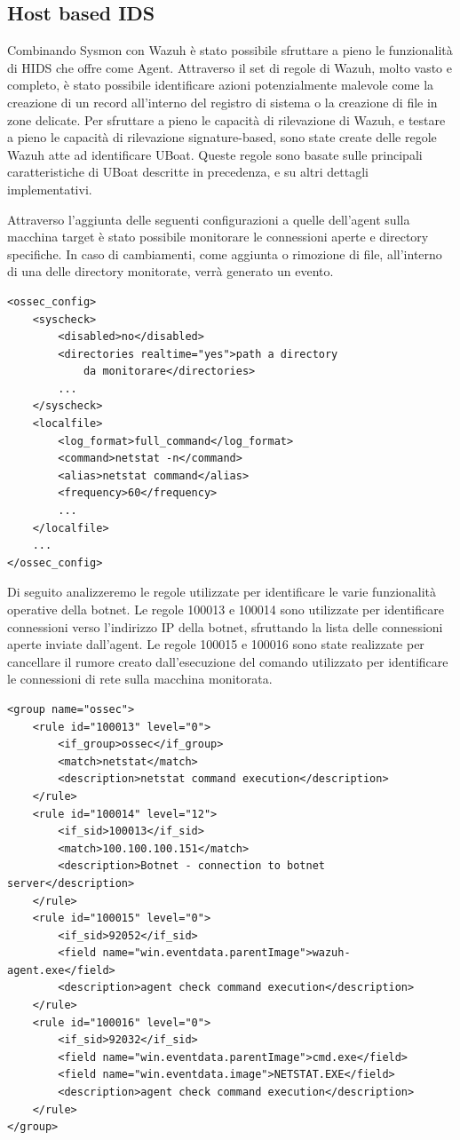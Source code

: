 \subsection{Host based IDS}
Combinando Sysmon con Wazuh è stato possibile sfruttare a pieno le funzionalità di HIDS che offre come Agent. Attraverso il set di regole di Wazuh, molto vasto e completo, è stato possibile identificare azioni potenzialmente malevole come la creazione di un record all'interno del registro di sistema o la creazione di file in zone delicate. Per sfruttare a pieno le capacità di rilevazione di Wazuh, e testare a pieno le capacità di rilevazione signature-based, sono state create delle regole Wazuh atte ad identificare UBoat.
Queste regole sono basate sulle principali caratteristiche di UBoat descritte in precedenza, e su altri dettagli implementativi.
\lstset{float,floatplacement=H,frame=none,tabsize=1,numbers=none}

Attraverso l'aggiunta delle seguenti configurazioni a quelle dell'agent sulla macchina target è stato possibile monitorare le connessioni aperte e  directory specifiche. In caso di cambiamenti, come aggiunta o rimozione di file, all'interno di una delle directory monitorate, verrà generato un evento.
\lstset{xleftmargin=1cm}
\begin{lstlisting}
<ossec_config>
    <syscheck>
        <disabled>no</disabled>
        <directories realtime="yes">path a directory 
            da monitorare</directories>
        ...
    </syscheck>
    <localfile>
        <log_format>full_command</log_format>
        <command>netstat -n</command>
        <alias>netstat command</alias>
        <frequency>60</frequency>
        ...
    </localfile>
    ...
</ossec_config>
\end{lstlisting}

Di seguito analizzeremo le regole utilizzate per identificare le varie funzionalità operative della botnet.
Le regole 100013 e 100014 sono utilizzate per identificare connessioni verso l'indirizzo IP della botnet, sfruttando la lista delle connessioni aperte inviate dall'agent. Le regole 100015 e 100016 sono state realizzate per cancellare il rumore creato dall'esecuzione del comando utilizzato per identificare le connessioni di rete sulla macchina monitorata.
\begin{lstlisting}
<group name="ossec">
    <rule id="100013" level="0">
        <if_group>ossec</if_group>
        <match>netstat</match>
        <description>netstat command execution</description>
    </rule>
    <rule id="100014" level="12">
        <if_sid>100013</if_sid>
        <match>100.100.100.151</match>
        <description>Botnet - connection to botnet server</description>
    </rule>
    <rule id="100015" level="0">
        <if_sid>92052</if_sid>
        <field name="win.eventdata.parentImage">wazuh-agent.exe</field>
        <description>agent check command execution</description>
    </rule>
    <rule id="100016" level="0">
        <if_sid>92032</if_sid>
        <field name="win.eventdata.parentImage">cmd.exe</field>
        <field name="win.eventdata.image">NETSTAT.EXE</field>
        <description>agent check command execution</description>
    </rule>
</group>
\end{lstlisting}

